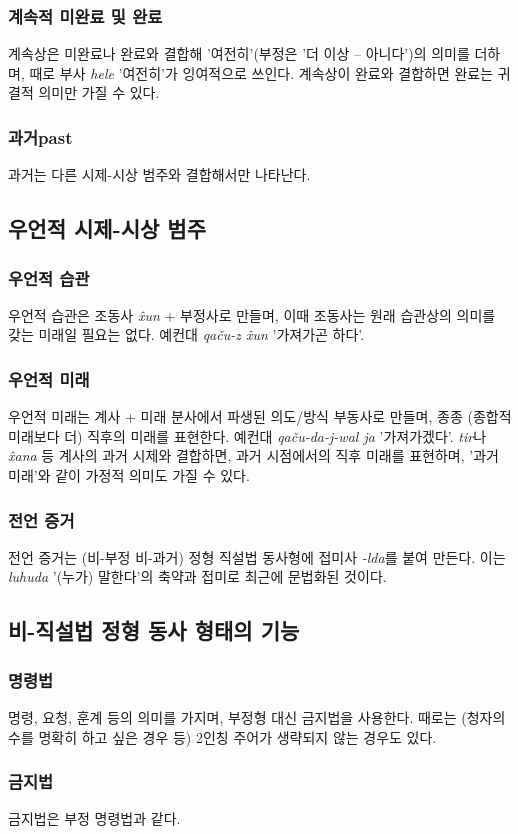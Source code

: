 \subsubsection{계속적 미완료 및 완료}
계속상은 미완료나 완료와 결합해 '여전히'(부정은 '더 이상 -- 아니다')의 의미를 더하며, 때로 부사 \textit{hele} '여전히'가 잉여적으로 쓰인다. 계속상이 완료와 결합하면 완료는 귀결적 의미만 가질 수 있다.
\subsubsection{과거past}
과거는 다른 시제-시상 범주와 결합해서만 나타난다.
\subsection{우언적 시제-시상 범주}
\subsubsection{우언적 습관}
우언적 습관은 조동사 \textit{x̂un} + 부정사로 만들며, 이때 조동사는 원래 습관상의 의미를 갖는 미래일 필요는 없다. 예컨대 \textit{qaču-z x̂un} '가져가곤 하다'.
\subsubsection{우언적 미래}
우언적 미래는 계사 + 미래 분사에서 파생된 의도/방식 부동사로 만들며, 종종 (종합적 미래보다 더) 직후의 미래를 표현한다. 예컨대 \textit{qaču-da-j-wal ja} '가져가겠다'. \textit{tir}나 \textit{x̂ana} 등 계사의 과거 시제와 결합하면, 과거 시점에서의 직후 미래를 표현하며, '과거 미래'와 같이 가정적 의미도 가질 수 있다.
\subsubsection{전언 증거}
전언 증거는 (비-부정 비-과거) 정형 직설법 동사형에 접미사 \textit{-lda}를 붙여 만든다. 이는 \textit{luhuda} '(누가) 말한다'의 축약과 접미로 최근에 문법화된 것이다.
\subsection{비-직설법 정형 동사 형태의 기능}
\subsubsection{명령법}
명령, 요청, 훈계 등의 의미를 가지며, 부정형 대신 금지법을 사용한다. 때로는 (청자의 수를 명확히 하고 싶은 경우 등) 2인칭 주어가 생략되지 않는 경우도 있다.
\subsubsection{금지법}
금지법은 부정 명령법과 같다.
